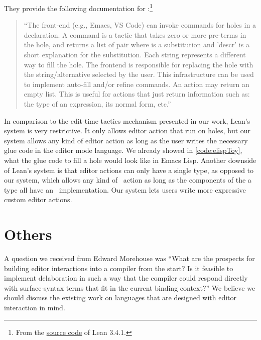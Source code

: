 They provide the following documentation for :\footnote{From
the \href{https://github.com/leanprover/lean/blob/17fe3decaf8ae236f0d0ff51ac8fd7f6940acdee/library/init/meta/hole\_command.lean}{source
code}
of Lean 3.4.1.}

\begin{quote}
  ``The front-end (e.g., Emacs, VS Code) can invoke commands for holes
   in a declaration. A command is a tactic that takes zero or
  more pre-terms in the hole, and returns a list of pair  where  is a substitution and 'descr' is a short explanation
  for the substitution.  Each string  represents a different way to fill
  the hole.  The frontend is responsible for replacing the hole with the
  string/alternative selected by the user.  This infrastructure can be used to
  implement auto-fill and/or refine commands. An action may return an empty
  list. This is useful for actions that just return information such as: the
  type of an expression, its normal form, etc.''
\end{quote}

In comparison to the edit-time tactics mechanism presented in our work, Lean's
system is very restrictive. It only allows editor action that run on holes, but
our system allows any kind of editor action as long as the user writes the
necessary glue code in the editor mode language. We already showed in
\autoref{code:elispToy}, what the glue code to fill a hole would look like in
Emacs Lisp. Another downside of Lean's system is that editor actions can only
have a single type, as opposed to our system, which allows any kind of
\Elab\ action as long as the components of the a type all have an
\Editorable\ implementation. Our system lets users write more expressive custom
editor actions.

\section{Others}

A question we received from Edward Morehouse was ``What are the prospects for
building editor interactions into a compiler from the start?  Is it feasible to
implement delaboration in such a way that the compiler could respond directly
with surface-syntax terms that fit in the current binding context?'' We believe
we should discuss the existing work on languages that are designed
with editor interaction in mind.

